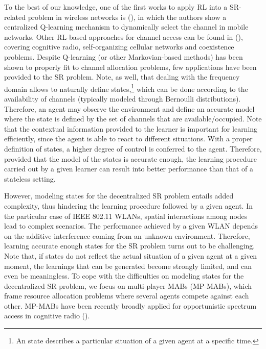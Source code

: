 \documentclass{article}
\begin{document}
To the best of our knowledge, one of the first works to apply RL into a SR-related problem in wireless networks is (\citealp{nie1999q}), in which the authors show a centralized Q-learning mechanism to dynamically select the channel in mobile networks. Other RL-based approaches for channel access can be found in (\citealp{li2009multi, bennis2010q, bennis2011distributed, sallent2015learning, rupasinghe2015reinforcement}), covering cognitive radio, self-organizing cellular networks and coexistence problems. Despite Q-learning (or other Markovian-based methods) has been shown to properly fit to channel allocation problems, few applications have been provided to the SR problem. Note, as well, that dealing with the frequency domain allows to naturally define states,\footnote{An state describes a particular situation of a given agent at a specific time.} which can be done according to the availability of channels (typically modeled through Bernoulli distributions). Therefore, an agent may observe the environment and define an accurate model where the state is defined by the set of channels that are available/occupied. Note that the contextual information provided to the learner is important for learning efficiently, since the agent is able to react to different situations. With a proper definition of states, a higher degree of control is conferred to the agent. Therefore, provided that the model of the states is accurate enough, the learning procedure carried out by a given learner can result into better performance than that of a stateless setting. 

However, modeling states for the decentralized SR problem entails added complexity, thus hindering the learning procedure followed by a given agent. In the particular case of IEEE 802.11 WLANs, spatial interactions among nodes lead to complex scenarios. The performance achieved by a given WLAN depends on the additive interference coming from an unknown environment. Therefore, learning accurate enough states for the SR problem turns out to be challenging. Note that, if states do not reflect the actual situation of a given agent at a given moment, the learnings that can be generated become strongly limited, and can even be meaningless. To cope with the difficulties on modeling states for the decentralized SR problem, we focus on multi-player MABs (MP-MABs), which frame resource allocation problems where several agents compete against each other. MP-MABs have been recently broadly applied for opportunistic spectrum access in cognitive radio (\citealp{liu2010distributed, anandkumar2011distributed, rosenski2016multi, maghsudi2015joint, maghsudi2015channel}). 
\end{document}
